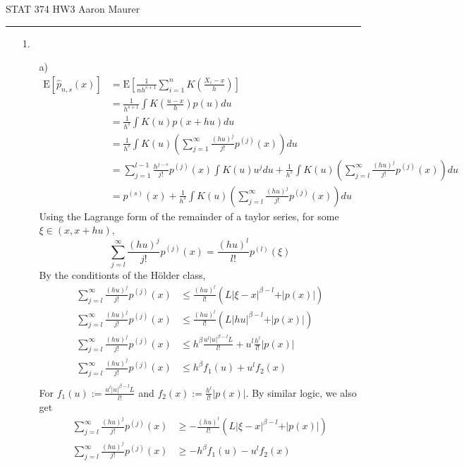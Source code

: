 \documentclass[11pt]{article}
\newcommand{\sumj}{\sum_{j=1}^\infty}
\newcommand{\E}{\mathrm{E}}
\theoremstyle{definition}
\begin{document}
STAT 374 HW3 \hfill Aaron Maurer
\vspace{2mm}
\hrule
\vspace{2mm}
\begin{itemize}
    \item[1.]
        \begin{itemize}
            \item[a)]
                \begin{align*}
                    \E[\hat p_{n,s}(x)] &= \E\left[\frac{1}{nh^{s+1}}\sum_{i=1}^n K\left(\frac{X_i-x}{h}\right)\right] \\
                                        &= \frac{1}{h^{s+1}}\int K\left(\frac{u-x}{h}\right)p(u) du\\
                                        &= \frac{1}{h^{s}}\int K\left(u\right)p(x+hu) du\\
                                        &= \frac{1}{h^{s}}\int K(u)\left(\sumj \frac{(hu)^j}{j!}p^{(j)}(x)\right) du\\
                                        &= \sum_{j=1}^{l-1}\frac{h^{j-s}}{j!}p^{(j)}(x)\int K(u)u^j du + \frac{1}{h^{s}}\int K(u)\left(\sum_{j=l}^\infty \frac{(hu)^j}{j!}p^{(j)}(x)\right) du\\
                                        &= p^{(s)}(x)+ \frac{1}{h^{s}}\int K(u)\left(\sum_{j=l}^\infty \frac{(hu)^j}{j!}p^{(j)}(x)\right) du
                \end{align*}
                Using the Lagrange form of the remainder of a taylor series, for some $\xi\in(x,x+hu)$,
                \[\sum_{j=l}^\infty \frac{(hu)^j}{j!}p^{(j)}(x) = \frac{(hu)^l}{l!}p^{(l)}(\xi)\]
                By the conditionts of the H{\"o}lder class,
                \begin{align*}
                    \sum_{j=l}^\infty \frac{(hu)^j}{j!}p^{(j)}(x) &\leq \frac{(hu)^l}{l!}(L\vert \xi - x\vert^{\beta-l} + \vert p(x)\vert) \\
                    \sum_{j=l}^\infty \frac{(hu)^j}{j!}p^{(j)}(x) &\leq \frac{(hu)^l}{l!}(L\vert hu\vert^{\beta-l}  + \vert p(x)\vert) \\
                    \sum_{j=l}^\infty \frac{(hu)^j}{j!}p^{(j)}(x) &\leq h^\beta\frac{u^l\vert u \vert^{\beta-l}L}{l!}+ u^l\frac{h^l}{l!}\vert p(x)\vert \\
                    \sum_{j=l}^\infty \frac{(hu)^j}{j!}p^{(j)}(x) &\leq h^\beta f_1(u)+ u^lf_2(x) \\
                \end{align*}
                For \(f_1(u):=\frac{u^l\vert u \vert^{\beta-l}L}{l!}\) and \(f_2(x):=\frac{h^l}{l!}\vert p(x)\vert\). By similar logic, we also get
                \begin{align*}
                    \sum_{j=l}^\infty \frac{(hu)^j}{j!}p^{(j)}(x) &\geq -\frac{(hu)^l}{l!}(L\vert \xi - x\vert^{\beta-l} + \vert p(x)\vert) \\
                    \sum_{j=l}^\infty \frac{(hu)^j}{j!}p^{(j)}(x) &\geq -h^\beta f_1(u)- u^lf_2(x) 
                \end{align*}


\end{itemize}
\end{itemize}
\end{document}
